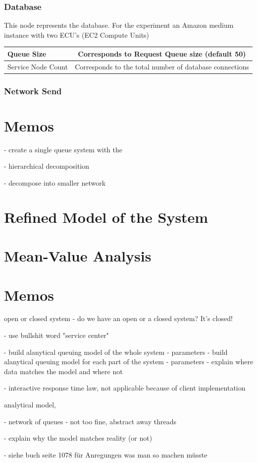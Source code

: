 \documentclass[a4paper]{article}
\begin{document}
\subsubsection{Database}
This node represents the database. For the experiment an Amazon medium instance with two ECU's (EC2 Compute Units)

\begin{tabular}{|l|c|}
\hline 
Queue Size & Corresponds to Request Queue size (default 50)\\ 
\hline 
Service Node Count & Corresponds to the total number of database connections \\ 
\hline 
\end{tabular} 


\subsubsection{Network Send}




\section{Memos}

- create a single queue system with the 

- hierarchical decomposition

- decompose into smaller network

\section{Refined Model of the System}


\section{Mean-Value Analysis}



\section{Memos}

open or closed system
- do we have an open or a closed system? It's closed!

- use bullshit word "service center"

- build alanytical queuing model of the whole system
  - parameters
- build alanytical queuing model for each part of the system
  - parameters
- explain where data matches the model and where not

- interactive response time law, not applicable because of client implementation

analytical model, 


- network of queues
  - not too fine, abstract away threads
  
  
- explain why the model matches reality (or not)


- siehe buch seite 1078 für Anregungen was man so machen müsste
\end{document}
